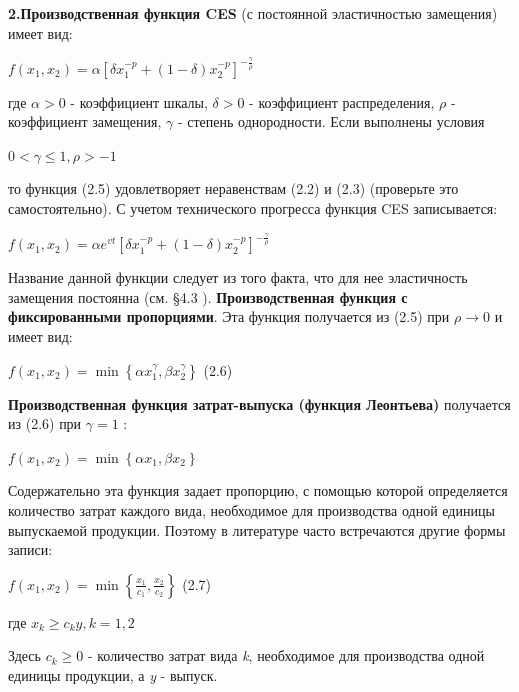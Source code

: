 \documentclass[12pt, 4paper]{book}
\begin{document}
{\textbf{2.Производственная функция CES }(с постоянной эластичностью замещения) имеет вид:
\begin{center}
$f(x_1,x_2)=\alpha [\delta x_{1}^{-p} + (1- \delta)x_{2}^{-p}]^{-\frac{\gamma}{\rho}}$
\end{center}
где $\alpha >0$ - коэффициент шкалы, $\delta > 0$ - коэффициент распределения, $\rho$ - коэффициент замещения, $\gamma$  - степень однородности. Если выполнены условия 
\begin{center}
$0 < \gamma \leq 1, \rho > -1$
\end{center}
то функция (2.5) удовлетворяет неравенствам (2.2) и (2.3) (проверьте это самостоятельно). С учетом технического прогресса функция CES записывается: 
\begin{center}
$f(x_1,x_2)=\alpha e^{vt}[\delta x_{1}^{-p} + (1- \delta)x_{2}^{-p}]^{-\frac{\gamma}{\rho}}$
\end{center}
\par

Название данной функции следует из того факта, что для нее эластичность замещения постоянна (см. §4.3 ). 
\textbf{Производственная функция с фиксированными пропорциями}. Эта функция получается из (2.5) при $\rho \rightarrow 0$ и имеет вид: 
\begin{center}
$ f(x_1,x_2) = \min \left\{\alpha x_{1}^{\gamma},\beta x_{2}^{\gamma}\right\}$ (2.6)
\end{center}
\par

\textbf{Производственная функция затрат-выпуска (функция Леонтьева) }получается из (2.6) при $\gamma =1$ : 
\begin{center}
$f(x_1,x_2)= \min \left\{\alpha x_1, \beta x_2\right\}$
\end{center}
\par

Содержательно эта функция задает пропорцию, с помощью которой определяется количество затрат каждого вида, необходимое для производства одной единицы выпускаемой продукции. Поэтому в литературе часто встречаются другие формы записи: 
\begin{center}
$f(x_1,x_2)=\min\left\{\frac{x_1}{c_1},\frac{x_2}{c_2}\right\}$ (2.7)
\end{center}
где $x_k \geq c_k y, k=1,2$
\par

Здесь $c_k \geq 0$  - количество затрат вида \textit{k}, необходимое для производства одной единицы продукции, а \textit{y} - выпуск. 
\par

}
\end{document}
